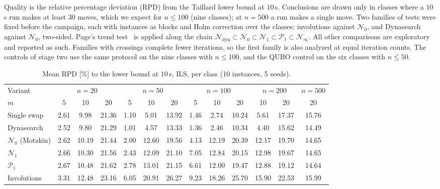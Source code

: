 \documentclass[10pt,twocolumn]{article}
\newcommand{\N}{\mathcal{N}}
\newcommand{\Pa}{\mathcal{P}}
\begin{document}
Quality is the relative percentage deviation (RPD) from the Taillard
lower bound at $10$\,s. Conclusions are drawn only in classes where a
$10$\,s run makes at least 30 moves, which we expect for $n\leq100$ (nine
classes); at $n=500$ a run makes a single move. Two families of tests
were fixed before the campaign, each with instances as blocks and Holm
correction over the classes: involutions against $\N_0$, and Dynasearch
against $\N_0$, two-sided. Page's trend test~\cite{page1963} is applied
along the chain
$\N_{\mathrm{dyn}}\subset\N_0\subset\N_1\subset\Pa_1\subset\N_\infty$.
All other comparisons are exploratory and reported as such. Families
with crossings complete fewer iterations, so the first family is also
analyzed at equal iteration counts. The controls of stage two use the
same protocol on the nine classes with $n\leq100$, and the QUBO control
on the six classes with $n\leq50$.

\begin{table}[t]
\centering
\caption{Mean RPD [\%] to the lower bound at $10$\,s, ILS, per class
(10 instances, 5 seeds).}
\label{tab:main}
\small
\begin{tabular}{@{}l*{12}{c}@{}}
\toprule
Variant & \multicolumn{3}{c}{$n=20$} & \multicolumn{3}{c}{$n=50$} &
\multicolumn{3}{c}{$n=100$} & \multicolumn{2}{c}{$n=200$} & $n=500$ \\
$m$ & 5 & 10 & 20 & 5 & 10 & 20 & 5 & 10 & 20 & 10 & 20 & 20 \\
\midrule
Single swap & 2.61 & 9.98 & 21.36 & 1.10 & 5.01 & 13.92 & 1.46 & 2.74 & 10.24 & 5.61 & 17.37 & 15.76 \\
Dynasearch & 2.52 & 9.80 & 21.29 & 1.01 & 4.57 & 13.33 & 1.36 & 2.46 & 10.34 & 4.40 & 15.62 & 14.49 \\
$\N_0$ (Motzkin) & 2.62 & 10.19 & 21.44 & 2.00 & 12.60 & 19.56 & 4.13 & 12.19 & 20.39 & 12.17 & 19.70 & 14.65 \\
$\N_1$ & 2.66 & 10.30 & 21.56 & 2.43 & 12.09 & 21.10 & 7.05 & 12.84 & 20.15 & 12.98 & 19.67 & 14.65 \\
$\Pa_1$ & 2.67 & 10.48 & 21.62 & 2.78 & 13.01 & 21.15 & 6.61 & 12.00 & 19.47 & 12.88 & 19.12 & 14.64 \\
Involutions & 3.31 & 12.48 & 23.16 & 6.05 & 20.91 & 26.27 & 9.23 & 18.26 & 25.70 & 15.90 & 22.53 & 15.99 \\
\bottomrule
\end{tabular}
\end{table}
\end{document}
